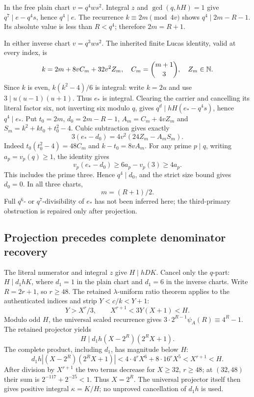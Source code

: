 In the free plain chart $v=q^4ws^2$. Integral $z$ and
$\gcd(q,hH)=1$ give $q^7\mid e-q^4s$, hence $q^4\mid e$.
The recurrence $k\equiv2m\pmod{4v}$ shows
$q^4\mid2m-R-1$. Its absolute value is less than $R<q^4$;
therefore $2m=R+1$.

In either inverse chart $v=q^3ws^2$. The inherited finite Lucas
identity, valid at every index, is
\[
 k=2m+8vC_m+32v^2Z_m,\quad
 C_m=\binom{m+1}{3},\quad Z_m\in\mathbb N.
\]
Since $k$ is even, $k(k^2-4)/6$ is integral: write $k=2u$
and use $3\mid u(u-1)(u+1)$. Thus $e_*$ is integral.
Clearing the carrier and cancelling its literal factor six, not
inverting six modulo $q$, gives $q^d\mid hH(e_*-q^4s)$,
hence $q^4\mid e_*$.
Put $t_0=2m$, $d_0=2m-R-1$, $A_m=C_m+4vZ_m$ and
$S_m=k^2+kt_0+t_0^2-4$. Cubic subtraction gives exactly
\begin{equation}\label{eq:inverse-cubic}
 3(e_*-d_0)=4v^2(24Z_m-A_mS_m).
\end{equation}
Indeed $t_0(t_0^2-4)=48C_m$ and $k-t_0=8vA_m$.
For any prime $p\mid q$, writing $a_p=v_p(q)\ge1$, the identity gives
\[
 v_p(e_*-d_0)\ge6a_p-v_p(3)\ge4a_p.
\]
This includes the prime three. Hence $q^4\mid d_0$, and the strict
size bound gives $d_0=0$. In all three charts,
\begin{equation}\label{eq:positive-index}
 m=(R+1)/2.
\end{equation}
Full $q^6$- or $q^7$-divisibility of $e_*$ has not been inferred here;
the third-primary obstruction is repaired only after projection.

\subsection{Projection precedes complete denominator recovery}
The literal numerator and integral $z$ give $H\mid hDK$.
Cancel only the $q$-part: $H\mid d_1hK$, where $d_1=1$ in
the plain chart and $d_1=6$ in the inverse charts.
Write $R=2r+1$, so $r\ge48$. The retained $\lambda$-uniform ratio
theorem applies to the authenticated indices and strip $Y<c/k<Y+1$:
\[
 Y>X^r/3,\qquad X^{r+1}<3Y(X+1)<H.
\]
Modulo odd $H$, the universal scaled recurrence gives
$3\cdot2^{R-1}\psi_A(R)\equiv4^R-1$. The retained projector yields
\[
 H\mid d_1h(X-2^R)(2^RX+1).
\]
The complete product, including $d_1$, has magnitude below $H$:
\[
 d_1h|(X-2^R)(2^RX+1)|
 <4\cdot4^rX^6+8\cdot16^rX^5<X^{r+1}<H.
\]
After division by $X^{r+1}$ the two terms decrease for $X\ge32$,
$r\ge48$; at $(32,48)$ their sum is $2^{-117}+2^{-25}<1$.
Thus $X=2^R$. The universal projector itself then gives positive
integral $\kappa=K/H$; no unproved cancellation of $d_1h$ is used.

